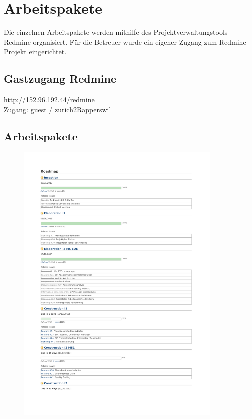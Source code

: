 \chapter{Arbeitspakete}
Die einzelnen Arbeitspakete werden mithilfe des Projektverwaltungstools Redmine
organisiert. Für die Betreuer wurde ein eigener Zugang zum Redmine-Projekt eingerichtet.

\section{Gastzugang Redmine}
http://152.96.192.44/redmine \\
Zugang: guest / zurich2Rapperswil \\

\section{Arbeitspakete}
	\begin{figure}[H]
		\includegraphics[trim=1.75cm 2cm 2cm 2.5cm, clip=true,page=1,width=0.88\textwidth]{../projektplan/media/roadmap.pdf}
	\end{figure}

